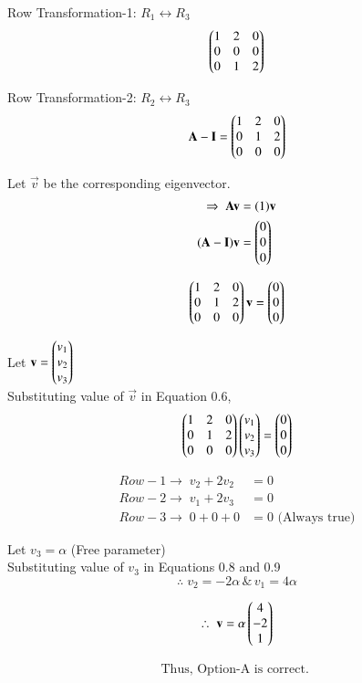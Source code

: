 \documentclass[journal]{IEEEtran}
\begin{document}
Row Transformation-1: $R_1 \leftrightarrow R_3$
\begin{equation}
\begin{pmatrix}1 & 2 & 0 \\ 0 & 0 & 0 \\ 0 & 1 & 2\end{pmatrix}
\end{equation}

Row Transformation-2: $R_2 \leftrightarrow R_3$
\begin{equation}
   \mathbf{A} - \mathbf{I} = \begin{pmatrix}1 & 2 & 0 \\ 0 & 1 & 2 \\ 0 & 0 & 0\end{pmatrix}
\end{equation}


Let $\vec{v}$ be the corresponding eigenvector.
\begin{align}
    \Rightarrow \; \mathbf{A}\mathbf{v} &= (1)\mathbf{v} \\ 
    (\mathbf{A} - \mathbf{I})\mathbf{v} &= \begin{pmatrix}0 \\ 0 \\ 0\end{pmatrix}
\end{align}

\begin{equation}
\begin{pmatrix}1 & 2 & 0 \\ 0 & 1 & 2 \\ 0 & 0 & 0\end{pmatrix}\mathbf{v} = \begin{pmatrix}0 \\ 0 \\ 0\end{pmatrix}    
\end{equation}


Let $\mathbf{v} = \begin{pmatrix}v_1 \\ v_2 \\ v_3\end{pmatrix}$\\

Substituting value of $\vec{v}$ in Equation 0.6,
\begin{equation}
   \begin{pmatrix}1 & 2 & 0 \\ 0 & 1 & 2 \\ 0 & 0 & 0\end{pmatrix}\begin{pmatrix}v_1 \\ v_2 \\ v_3\end{pmatrix} = \begin{pmatrix}0 \\ 0 \\ 0\end{pmatrix} 
\end{equation}

\begin{align}
    Row-1 \rightarrow \; v_2 + 2v_2 &= 0\\
    Row-2 \rightarrow \; v_1 + 2v_3 &= 0\\
    Row-3 \rightarrow \; 0 + 0 + 0 &= 0 \text{ (Always true)}
\end{align}

Let $v_3 = \alpha$ (Free parameter)\\
Substituting value of $v_3$ in Equations 0.8 and 0.9
\begin{equation}
\therefore \; v_2 = -2\alpha \, \&  \, v_1 = 4\alpha  
\end{equation}

\begin{equation}
    \therefore \; \mathbf{v} = \alpha \begin{pmatrix}4 \\ -2 \\ 1\end{pmatrix} 
\end{equation}

\begin{align*}
    \boxed{\text{Thus, Option-A is correct. }}
\end{align*}
\end{document}
